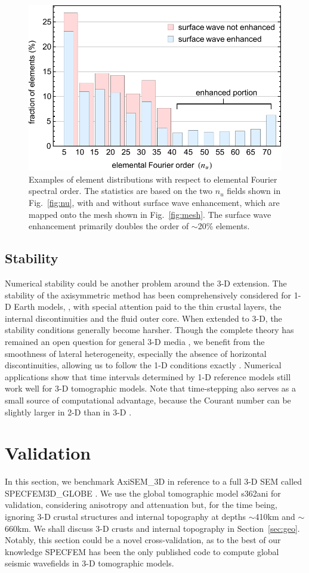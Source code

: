 \documentclass[extra]{gji}
\begin{document}
\begin{figure}
  \centering
  \includegraphics[width=.46\textwidth]{fig/elecnt/elecnt.pdf}
  \caption{Examples of element distributions with respect to elemental 
  Fourier spectral order. The statistics are based on the two $n_u$ fields shown in Fig.~\ref{fig:nu},
  with and without surface wave enhancement, which are mapped onto the mesh
  shown in Fig.~\ref{fig:mesh}. 
  The surface wave enhancement primarily doubles the order of  
  $\sim$20\% elements.} 
  \label{fig:count}
\end{figure}

\subsection{Stability}
Numerical stability could be another problem around the 3-D extension.
The stability of the axisymmetric method has been 
comprehensively considered for 1-D Earth models, 
\cite[]{nissen2008sem}, with special attention paid to the thin 
crustal layers, the internal discontinuities and the fluid outer core.
When extended to 3-D, the stability conditions generally become harsher.
Though the complete theory has remained an open question for 
general 3-D media \cite[]{gottlieb2001spectral}, we benefit 
from the smoothness of lateral heterogeneity, especially 
the absence of horizontal discontinuities,
allowing us to follow the 1-D conditions exactly
\cite[]{gottlieb2001spectral, gottlieb1981stability}. Numerical
applications show that time intervals determined by 1-D 
reference models still work well for 3-D tomographic models.
Note that time-stepping also serves as a small source of computational 
advantage, because the Courant number can be slightly larger 
in 2-D than in 3-D \cite[]{komatitsch1998spectral}.
 
 
\section{Validation}
\label{sec:ben}
In this section, we benchmark AxiSEM\_3D in reference to 
a full 3-D SEM called SPECFEM3D\_GLOBE 
\cite[SPECFEM,][]{komatitsch2002spectralI,komatitsch2002spectralII}. 
We use the global tomographic model s362ani \cite[]{kustowski2008s362ani}
for validation, considering anisotropy \cite[]{van2014seismic}
and attenuation \cite[]{van2014optimized} but, for the time being,
ignoring 3-D crustal structures and internal topography at depths 
$\sim$410km and $\sim$660km. 
We shall discuss 3-D crusts and internal topography in Section~\ref{sec:geo}. 
Notably, this section could be a novel cross-validation, 
as to the best of our knowledge SPECFEM has been
the only published code to compute global seismic wavefields in 
3-D tomographic models.  
\end{document}
